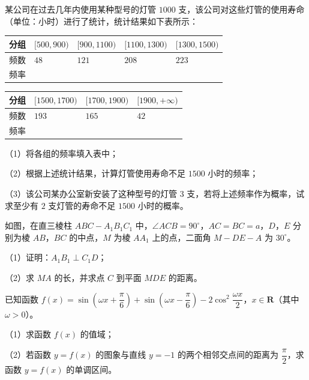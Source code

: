 \begin{question}
某公司在过去几年内使用某种型号的灯管 $1000$ 支，该公司对这些灯管的使用寿命（单位：小时）进行了统计，统计结果如下表所示：

\begin{center}
\begin{tabular}{lllll}
\toprule
分组 & $[500,900)$ & $[900,1100)$ & $[1100,1300)$ & $[1300,1500)$ \\
\midrule
频数 & $48$ & $121$ & $208$ & $223$ \\
频率 &  &  &  &  \\
\bottomrule
\end{tabular}
\end{center}

\begin{center}
\begin{tabular}{llll}
\toprule
分组 & $[1500,1700)$ & $[1700,1900)$ & $[1900,+\infty)$ \\
\midrule
频数 & $193$ & $165$ & $42$ \\
频率 &  &  &  \\
\bottomrule
\end{tabular}
\end{center}

（1）将各组的频率填入表中；

（2）根据上述统计结果，计算灯管使用寿命不足 $1500$ 小时的频率；

（3）该公司某办公室新安装了这种型号的灯管 $3$ 支，若将上述频率作为概率，试求至少有 $2$ 支灯管的寿命不足 $1500$ 小时的概率。

\Needspace{0.4\textheight}
\end{question}
\begin{question}
如图，在直三棱柱 $ABC-A_1B_1C_1$ 中，$\angle ACB=90^\circ$，$AC=BC=a$，$D$，$E$ 分别为棱 $AB$，$BC$ 的中点，$M$ 为棱 $AA_1$ 上的点，二面角 $M-DE-A$ 为 $30^\circ$。

（1）证明：$A_1B_1\perp C_1D$；

（2）求 $MA$ 的长，并求点 $C$ 到平面 $MDE$ 的距离。
\nopagebreak[4]
\begin{center}\end{center}
\nopagebreak[4]
\end{question}
\begin{question}
已知函数 $f(x)=\sin\left(\omega x+\dfrac{\pi}{6}\right)+\sin\left(\omega x-\dfrac{\pi}{6}\right)-2\cos^2\dfrac{\omega x}{2}$，$x\in\mathbf R$（其中 $\omega>0$）。

（1）求函数 $f(x)$ 的值域；

（2）若函数 $y=f(x)$ 的图象与直线 $y=-1$ 的两个相邻交点间的距离为 $\dfrac{\pi}{2}$，求函数 $y=f(x)$ 的单调区间。

\end{question}
